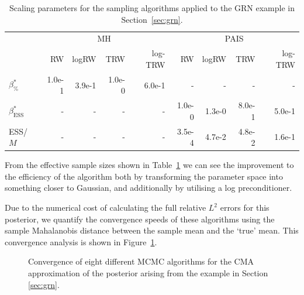 \documentclass[final]{siamltex}
\begin{document}
\begin{table}[!h]
	\centering
	\begin{tabular}{lrrrrrrrr}
	\toprule
		 & \multicolumn{4}{c}{MH} & \multicolumn{4}{c}{PAIS} \\ \cmidrule(lr){2-5} \cmidrule(lr){6-9}
		& RW & logRW & TRW & log-TRW & RW & logRW & TRW & log-TRW \\ \midrule
		$\beta_{\%}^*$	 	& 1.0e-1 & 3.9e-1 & 1.0e-0 &6.0e-1 & - & - & - & - \\
		$\beta_{\text{ESS}}^*$	& - 	        & -           & -            & -            & 1.0e-0 & 1.3e-0 & 8.0e-1 & 5.0e-1 \\
		ESS/$M$		 		& - 	        & -           & -            & -            & 3.5e-4 & 4.7e-2 & 4.8e-2 & 1.6e-1  \\
	\bottomrule
	\end{tabular}
	\caption{Scaling parameters for the sampling algorithms applied to the GRN example in Section~\ref{sec:grn}.}
	\label{tab:grn_scaling_parameters}
\end{table}

From the effective sample sizes shown in
Table~\ref{tab:grn_scaling_parameters} we can see the improvement to
the efficiency of the algorithm both by transforming the parameter
space into something closer to Gaussian, and additionally by utilising
a log preconditioner.

Due to the numerical cost of calculating the full relative $L^2$ errors for this posterior, we quantify the convergence speeds of these algorithms using the sample Mahalanobis distance between the sample mean and the `true' mean. This convergence analysis is shown in Figure~\ref{fig:grn_L2}.

\begin{figure}[!htb]
\centering
{}
\caption{Convergence of eight different MCMC algorithms for the CMA
  approximation of the  posterior arising from the example in Section \ref{sec:grn}.}
\label{fig:grn_L2}
\end{figure}
\end{document}
